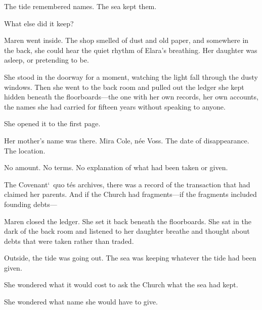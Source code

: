\documentclass[12pt,letterpaper,openany]{book}
\begin{document}
\par
The tide remembered names. The sea kept them.
\par
What else did it keep?
\par
Maren went inside. The shop smelled of dust and old paper, and somewhere in the back, she could hear the quiet rhythm of Elara's breathing. Her daughter was asleep, or pretending to be.
\par
She stood in the doorway for a moment, watching the light fall through the dusty windows. Then she went to the back room and pulled out the ledger she kept hidden beneath the floorboards—the one with her own records, her own accounts, the names she had carried for fifteen years without speaking to anyone.
\par
She opened it to the first page.
\par
Her mother's name was there. Mira Cole, née Voss. The date of disappearance. The location.
\par
No amount. No terms. No explanation of what had been taken or given.
\par
The Covenant`\ quo t\'e{}s archives, there was a record of the transaction that had claimed her parents. And if the Church had fragments—if the fragments included founding debts—
\par
Maren closed the ledger. She set it back beneath the floorboards. She sat in the dark of the back room and listened to her daughter breathe and thought about debts that were taken rather than traded.
\par
Outside, the tide was going out. The sea was keeping whatever the tide had been given.
\par
She wondered what it would cost to ask the Church what the sea had kept.
\par
She wondered what name she would have to give.
\par
\end{document}
